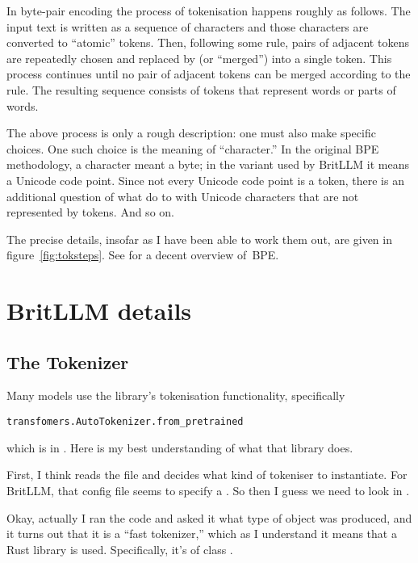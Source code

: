 \documentclass[11pt, a4paper]{article}
\begin{document}
In byte-pair encoding the process of tokenisation happens roughly as
follows. The input text is written as a sequence of characters and
those characters are converted to ``atomic'' tokens. Then, following
some rule, pairs of adjacent tokens are repeatedly chosen and replaced
by (or ``merged'') into a single token. This process continues until
no pair of adjacent tokens can be merged according to the rule. The
resulting sequence consists of tokens that represent words or parts of
words.

The above process is only a rough description: one must also make
specific choices. One such choice is the meaning of ``character.'' In
the original BPE methodology, a character meant a byte; in the variant
used by BritLLM it means a Unicode code point. Since not every Unicode
code point is a token, there is an additional question of what do to
with Unicode characters that are not represented by tokens. And so on.

The precise details, insofar as I have been able to work them out, are
given in figure~\ref{fig:toksteps}. See \textcite{zouhar2023formal}
for a decent overview of~BPE\@.



\printbibliography


\appendix

\section{BritLLM details}

\subsection{The Tokenizer}

Many models use the  library's tokenisation
functionality, specifically
\begin{verbatim}
transfomers.AutoTokenizer.from_pretrained
\end{verbatim}
which is in . Here is my best
understanding of what that library does.

First, I think  reads the file
 and decides what kind of tokeniser to
instantiate. For BritLLM, that config file seems to specify a
. So then I guess we need to look in
.

Okay, actually I ran the code and asked it what type of object was
produced, and it turns out that it is a ``fast tokenizer,'' which as I
understand it means that a Rust library is used. Specifically, it's of
class
. 
\end{document}
